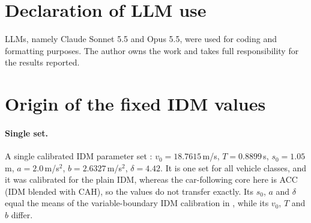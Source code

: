 \documentclass[11pt]{article}
\begin{document}
\section*{Declaration of LLM use}
LLMs, namely Claude Sonnet 5.5 and Opus 5.5, were used for coding and formatting
purposes. The author owns the work and takes full responsibility for the
results reported.

\appendix
\section{Origin of the fixed IDM values}
\label{app:idm}

\paragraph{Single set.} A single calibrated IDM parameter set \cite{chandra}:
$v_0=18.7615$\,m/s, $T=0.8899$\,s, $s_0=1.05$\,m, $a=2.0$\,m/s$^2$,
$b=2.6327$\,m/s$^2$, $\delta=4.42$. It is one set for all vehicle classes, and
it was calibrated for the plain IDM, whereas the car-following core here is ACC
(IDM blended with CAH), so the values do not transfer exactly. Its $s_0$, $a$
and $\delta$ equal the means of the variable-boundary IDM calibration in
\cite[slide~23]{duggal}, while its $v_0$, $T$ and $b$ differ.
\end{document}

